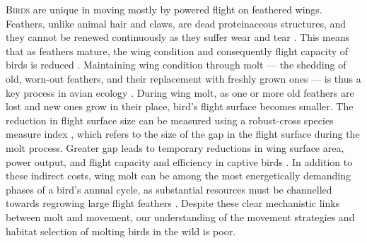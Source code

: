 
\begin{refsection}

\newrefcontext[sorting=ynt]

\lettrine{B}{irds} are unique in moving mostly by powered flight on feathered wings.
Feathers, unlike animal hair and claws, are dead proteinaceous structures, and they cannot be renewed continuously as they suffer wear and tear \cite{rayner1988,jenni1989}.
This means that as feathers mature, the wing condition and consequently flight capacity of birds is reduced \cite{lindstrom1994,hedenstrom1999,hedenstrom2003}.
Maintaining wing condition through molt --- the shedding of old, worn-out feathers, and their replacement with freshly grown ones --- is thus a key process in avian ecology \cite{ginn1983,rayner1988}.
During wing molt, as one or more old feathers are lost and new ones grow in their place, bird's flight surface becomes smaller.
The reduction in flight surface size can be measured using a robust-cross species measure index \citep{lind2001,kiat2016}, which refers to the size of the gap in the flight surface during the molt process.
Greater gap leads to temporary reductions in wing surface area, power output, and flight capacity and efficiency in captive birds \cite{tucker1991,swaddle1996,swaddle1997,williams2003,lind2001,lind2001a,bowlin2009}.
In addition to these indirect costs, wing molt can be among the most energetically demanding phases of a bird's annual cycle, as substantial resources must be channelled towards regrowing large flight feathers \cite{lindstrom1993,newton2009,kiat2017}.
Despite these clear mechanistic links between molt and movement, our understanding of the movement strategies and habitat selection of molting birds in the wild is poor.


\end{refsection}
